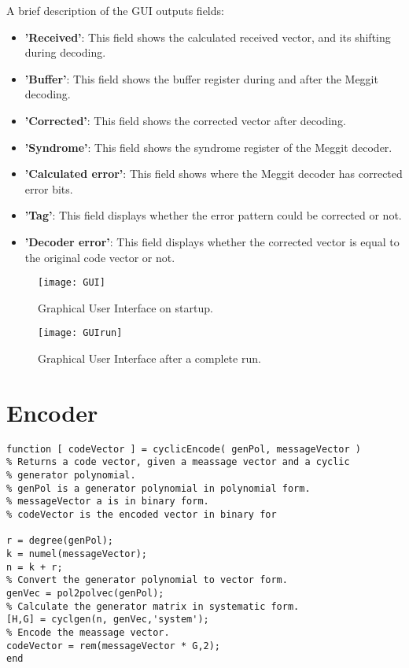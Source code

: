 \documentclass[MiniProjectMain]{subfiles}
\begin{document}
A brief description of the GUI outputs fields:
\begin{itemize}
\item \textbf{'Received'}: This field shows the calculated received vector, and its shifting during decoding.

\item \textbf{'Buffer'}: This field shows the buffer register during and after the Meggit decoding.

\item \textbf{'Corrected'}: This field shows the corrected vector after decoding.

\item \textbf{'Syndrome'}: This field shows the syndrome register of the Meggit decoder.

\item \textbf{'Calculated error'}: This field shows where the Meggit decoder has corrected error bits. 

\item \textbf{'Tag'}: This field displays whether the error pattern could be corrected or not.

\item \textbf{'Decoder error'}: This field displays whether the corrected vector is equal to the original code vector or not. 
\end{itemize}

\begin{figure}
\begin{center}
\texttt{[image: GUI]}
\caption{Graphical User Interface on startup.}
\label{fig:GUI}
\end{center}
\end{figure}

\begin{figure}
\begin{center}
\texttt{[image: GUIrun]}
\caption{Graphical User Interface after a complete run.}
\label{fig:GUIrun}
\end{center}
\end{figure}

\newpage
\section{Encoder}
\begin{lstlisting}[caption=Cyclic encoding]
function [ codeVector ] = cyclicEncode( genPol, messageVector )
% Returns a code vector, given a meassage vector and a cyclic 
% generator polynomial.
% genPol is a generator polynomial in polynomial form.
% messageVector a is in binary form.
% codeVector is the encoded vector in binary for

r = degree(genPol);
k = numel(messageVector);
n = k + r;
% Convert the generator polynomial to vector form.
genVec = pol2polvec(genPol);
% Calculate the generator matrix in systematic form.
[H,G] = cyclgen(n, genVec,'system');
% Encode the meassage vector.
codeVector = rem(messageVector * G,2);
end
\end{lstlisting}
\end{document}
